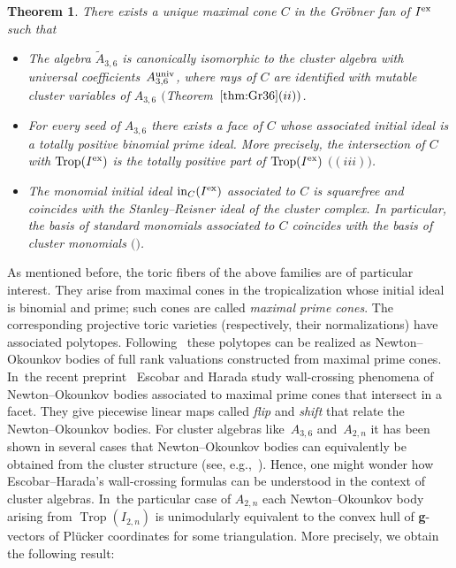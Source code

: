 \documentclass[pdftex]{sigma}%
\newtheorem{Theorem}{Theorem}[section]
\numberwithin{equation}{section}
\DeclareMathOperator{\init}{in}
\DeclareMathOperator{\trop}{Trop}
\begin{document}
\begin{Theorem}%
There exists a unique maximal cone $C$ in the Gr\"obner fan of $I^{\rm ex}$ such that
\begin{itemize}\itemsep=0pt
 \item[$(i)$] The algebra $\tilde A_{3,6}$ is canonically isomorphic to the cluster algebra with universal coeffici\-ents~$A^{\rm univ}_{3,6}$, where rays of $C$ are identified with mutable cluster variables of $A_{3,6}$ $($Theo\-rem~$\ref{thm:Gr36}(ii))$.
 \item[$(ii)$] For every seed of $A_{3,6}$ there exists a face of $C$ whose associated initial ideal is a totally positive binomial prime ideal. More precisely, the intersection of $C$ with $\trop(I^{\rm ex})$ is the totally positive part of $\trop(I^{\rm ex})$ $($$(iii))$.
 \item[$(iii)$] The monomial initial ideal $\init_C(I^{\rm ex})$ associated to $C$ is squarefree and coincides with the Stanley--Reisner ideal of the cluster complex. In particular, the basis of standard monomials associated to $C$ coincides with the basis of cluster monomials $($$)$.
\end{itemize}
\end{Theorem}

As mentioned before, the toric fibers of the above families are of particular interest.
They arise from maximal cones in the tropicalization whose initial ideal is binomial and prime; such cones are called {\it maximal prime cones}.
The corresponding projective toric varieties (respectively, their normalizations) have associated polytopes.
Following~\cite{KM16} these polytopes can be realized as Newton--Okounkov bodies of full rank valuations constructed from maximal prime cones.
In~the recent preprint~\cite{EH-NObodies} Escobar and Harada study wall-crossing phenomena of Newton--Okounkov bodies associated to maximal prime cones that intersect in a facet.
They give piecewise linear maps called {\it flip} and {\it shift} that relate the Newton--Okounkov bodies.
For cluster algebras like~$A_{3,6}$ and~$A_{2,n}$ it has been shown in several cases that Newton--Okounkov bodies can equivalently be obtained from the cluster structure (see, e.g.,~\cite{BCMN,BF19,FO20,RW17}).
Hence, one might wonder how Escobar--Harada's wall-crossing formulas can be understood in the context of cluster algebras.
In~the particular case of $A_{2,n}$ each Newton--Okounkov body arising from $\trop(I_{2,n})$ is unimodularly equivalent to the convex hull of {\bf g}-vectors of Pl\"ucker coordinates for some triangulation.
More precisely, we obtain the following result:
\end{document}

